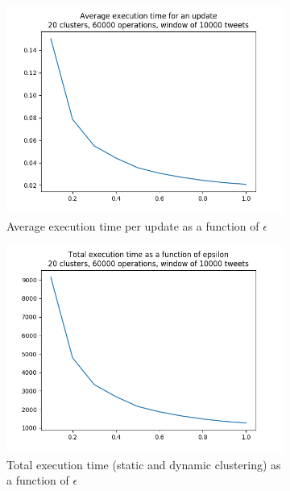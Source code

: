 \documentclass[a4paper,10pt]{article}
\begin{document}
\begin{appendices}
\begin{figure}[h]
\begin{subfigure}[b]{0.3\textwidth}
		\includegraphics[width=\textwidth]{pictures/average_execution_times_per_update_20_60000_10000.png}
		\caption{Average execution time per update as a function of $\epsilon$}
	\end{subfigure}
	\begin{subfigure}[b]{0.3\textwidth}
		\includegraphics[width=\textwidth]{pictures/final_execution_times_20_60000_10000.png}
		\caption{Total execution time (static and dynamic clustering) as a function of $\epsilon$}
	\end{subfigure}
	\begin{subfigure}[b]{0.3\textwidth}

\end{subfigure}
\end{figure}
\end{appendices}
\end{document}
